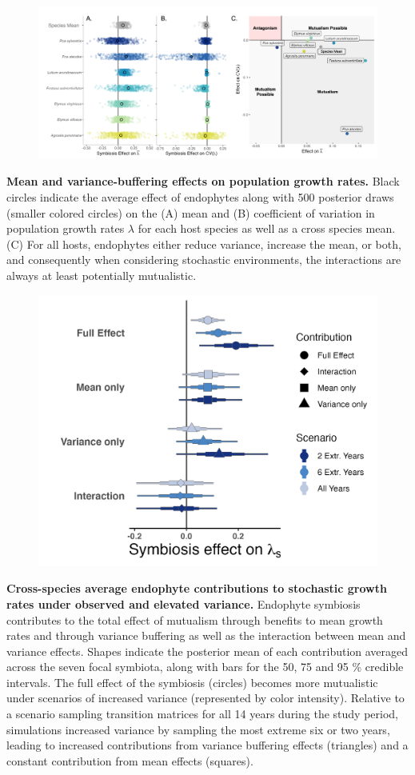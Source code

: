 \documentclass[12pt]{article}
\begin{document}
\begin{figure}
	\centering
	\includegraphics[width=\linewidth]{StochDemo_fig2.png}
\end{figure}
 \textbf{Mean and variance-buffering effects on population growth rates.} Black circles indicate the average effect of endophytes along with 500 posterior draws (smaller colored circles) on the (A) mean and (B) coefficient of variation in population growth rates $\lambda$ for each host species as well as a cross species mean. (C) For all hosts, endophytes either reduce variance, increase the mean, or both, and consequently when considering stochastic environments, the interactions are always at least potentially mutualistic.
\newpage

\begin{figure}
	\centering
	\includegraphics[width=.8\linewidth]{StochDemo_fig3.png}
\end{figure}
 \textbf{Cross-species average endophyte contributions to stochastic growth rates under observed and elevated variance.} Endophyte symbiosis contributes to the total effect of mutualism through benefits to mean growth rates and through variance buffering as well as the interaction between mean and variance effects. Shapes indicate the posterior mean of each contribution averaged across the seven focal symbiota, along with bars for the 50, 75 and 95 \% credible intervals.  The full effect of the symbiosis (circles) becomes more mutualistic under scenarios of increased variance (represented by color intensity). Relative to a scenario sampling transition matrices for all 14 years during the study period, simulations increased variance by sampling the most extreme six or two years, leading to increased contributions from variance buffering effects (triangles) and a constant contribution from mean effects (squares).
\newpage
\end{document}
